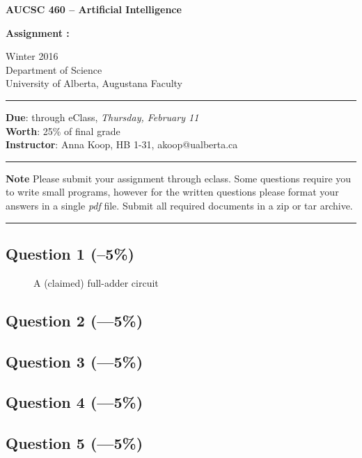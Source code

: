 \documentclass[12pt]{article}
\begin{document}
\noindent
{\Large\bf AUCSC 460 -- Artificial Intelligence}

\vspace*{1\baselineskip}

\noindent
{\large\bf Assignment : }

\vspace*{1\baselineskip}

\noindent
Winter 2016\\
Department of Science\\
University of Alberta, Augustana Faculty

\vspace*{1.75\baselineskip}
\hrule

\vspace*{0.75\baselineskip}

\noindent
{\bf Due}: through eClass, {\em Thursday, February 11}\\
{\bf Worth}: 25\% of final grade
\\
{\bf Instructor}: Anna Koop, HB 1-31, akoop@ualberta.ca

\vspace*{0.75\baselineskip}

\hrule

\vspace*{1\baselineskip}

\noindent
{\bf Note}
Please submit your assignment through eclass. Some questions require you to write small programs,
however for the written questions please format your answers
in a single {\em pdf\/} file.
Submit all required documents in a zip or tar archive.


\vspace*{1\baselineskip}

\hrule


\subsection*{Question 1 \rm(--5\%)}
\begin{figure}[bt]
\caption{A (claimed) full-adder circuit}
\label{fig:adder}
\centering
\end{figure}


\subsection*{Question 2 \rm(---5\%)}

\subsection*{Question 3 \rm(---5\%)}

\subsection*{Question 4 \rm(---5\%)}

\subsection*{Question 5 \rm(---5\%)}
\end{document}

